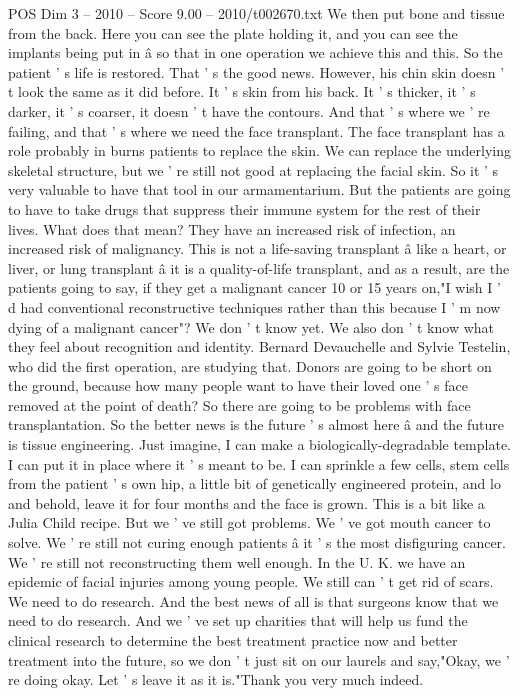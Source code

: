 \begin{textsample}{POS Dim 3 – 2010 – Score 9.00 – 2010/t002670.txt}
We then put bone and tissue from the back.
Here you can see the plate holding it, and you can see the implants being put in â so that in one operation we achieve this and this.
So the patient ' s life is restored.
That ' s the good news.
However, his chin skin doesn ' t look the same as it did before.
It ' s skin from his back.
It ' s thicker, it ' s darker, it ' s coarser, it doesn ' t have the contours.
And that ' s where we ' re failing, and that ' s where we need the face transplant.
The face transplant has a role probably in burns patients to replace the skin.
We can replace the underlying skeletal structure, but we ' re still not good at replacing the facial skin.
So it ' s very valuable to have that tool in our armamentarium.
But the patients are going to have to take drugs that suppress their immune system for the rest of their lives.
What does that mean?
They have an increased risk of infection, an increased risk of malignancy.
This is not a life-saving transplant â like a heart, or liver, or lung transplant â it is a quality-of-life transplant, and as a result, are the patients going to say, if they get a malignant cancer 10 or 15 years on,"I wish I ' d had conventional reconstructive techniques rather than this because I ' m now dying of a malignant cancer"?
We don ' t know yet.
We also don ' t know what they feel about recognition and identity.
Bernard Devauchelle and Sylvie Testelin, who did the first operation, are studying that.
Donors are going to be short on the ground, because how many people want to have their loved one ' s face removed at the point of death?
So there are going to be problems with face transplantation.
So the better news is the future ' s almost here â and the future is tissue engineering.
Just imagine, I can make a biologically-degradable template.
I can put it in place where it ' s meant to be.
I can sprinkle a few cells, stem cells from the patient ' s own hip, a little bit of genetically engineered protein, and lo and behold, leave it for four months and the face is grown.
This is a bit like a Julia Child recipe.
But we ' ve still got problems.
We ' ve got mouth cancer to solve.
We ' re still not curing enough patients â it ' s the most disfiguring cancer.
We ' re still not reconstructing them well enough.
In the U.
K. we have an epidemic of facial injuries among young people.
We still can ' t get rid of scars.
We need to do research.
And the best news of all is that surgeons know that we need to do research.
And we ' ve set up charities that will help us fund the clinical research to determine the best treatment practice now and better treatment into the future, so we don ' t just sit on our laurels and say,"Okay, we ' re doing okay.
Let ' s leave it as it is."Thank you very much indeed.

\end{textsample}
